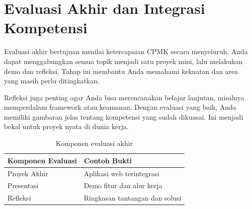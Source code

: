 \section{Evaluasi Akhir dan Integrasi Kompetensi}
Evaluasi akhir bertujuan menilai ketercapaian CPMK secara menyeluruh. Anda dapat menggabungkan semua topik menjadi satu proyek mini, lalu melakukan demo dan refleksi. Tahap ini membantu Anda memahami kekuatan dan area yang masih perlu ditingkatkan.

Refleksi juga penting agar Anda bisa merencanakan belajar lanjutan, misalnya memperdalam framework atau keamanan. Dengan evaluasi yang baik, Anda memiliki gambaran jelas tentang kompetensi yang sudah dikuasai. Ini menjadi bekal untuk proyek nyata di dunia kerja.

\begin{table}[ht]
\centering
\begin{tabular}{|P{4cm}|P{7cm}|}
\hline
\textbf{Komponen Evaluasi} & \textbf{Contoh Bukti} \\
\hline
Proyek Akhir & Aplikasi web terintegrasi \\
\hline
Presentasi & Demo fitur dan alur kerja \\
\hline
Refleksi & Ringkasan tantangan dan solusi \\
\hline
\end{tabular}
\caption{Komponen evaluasi akhir}
\end{table}

